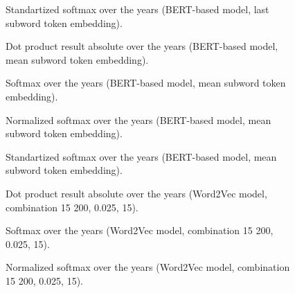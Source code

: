 \documentclass[10pt,letterpaper]{article}
\begin{document}
\begin{figure}[!ht]
    \centering
    \caption{Standartized softmax over the years (BERT-based model, last subword token embedding).}
    \label{fig:softmax_standartization_last_subword}
\end{figure}

\begin{figure}[!ht]
    \centering
    \caption{Dot product result absolute over the years (BERT-based model, mean subword token embedding).}
    \label{fig:dp_absolute_mean_subword}
\end{figure}

\begin{figure}[!ht]
    \centering
    \caption{Softmax over the years (BERT-based model, mean subword token embedding).}
    \label{fig:softmax_mean_subword}
\end{figure}

\begin{figure}[!ht]
    \centering
    \caption{Normalized softmax over the years (BERT-based model, mean subword token embedding).}
    \label{fig:softmax_normalization_mean_subword}
\end{figure}

\begin{figure}[!ht]
    \centering
    \caption{Standartized softmax over the years (BERT-based model, mean subword token embedding).}
    \label{fig:softmax_standartization_mean_subword}
\end{figure}

\begin{figure}[!ht]
    \centering
    \caption{Dot product result absolute over the years (Word2Vec model, combination 15 {200, 0.025, 15}).}
    \label{fig:dp_absolute_w2v_comb15}
\end{figure}

\begin{figure}[!ht]
    \centering
    \caption{Softmax over the years (Word2Vec model, combination 15 {200, 0.025, 15}).}
    \label{fig:softmax_w2v_comb15}
\end{figure}

\begin{figure}[!ht]
    \centering
    \caption{Normalized softmax over the years (Word2Vec model, combination 15 {200, 0.025, 15}).}
    \label{fig:softmax_normalization_w2v_comb15}
\end{figure}
\end{document}
